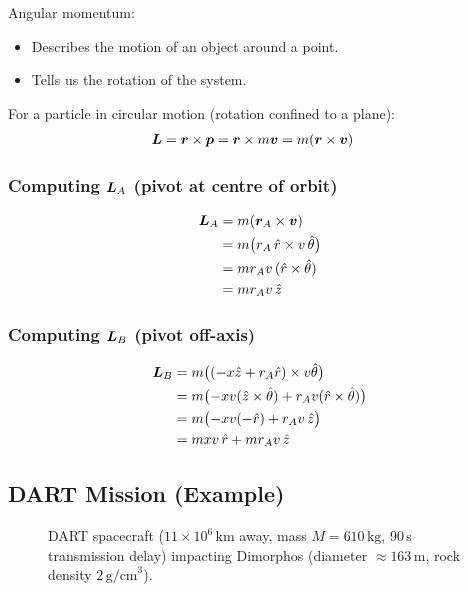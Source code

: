 Angular momentum:
\begin{itemize}
    \item Describes the motion of an object around a point.
    \item Tells us the rotation of the system.
\end{itemize}

For a particle in circular motion (rotation confined to a plane):
\begin{align*}
    \vect{L} &= \lvect{r} \times \lvect{p} = \lvect{r} \times m\lvect{v} = m(\lvect{r}\times\lvect{v})
\end{align*}

\subsubsection*{Computing $\vect{L}_A$ (pivot at centre of orbit)}

\begin{align*}
    \vect{L}_A &= m(\lvect{r}_A \times \lvect{v}) \\
    &= m\bigl(r_A\,\hat{r} \times v\,\hat{\theta}\bigr) \\
    &= mr_A v\,(\hat{r}\times\hat{\theta}) \\
    &= mr_A v\,\hat{z}
\end{align*}

\subsubsection*{Computing $\vect{L}_B$ (pivot off-axis)}

\begin{align*}
    \vect{L}_B &= m\bigl((-x\hat{z}+r_A\hat{r})\times v\hat{\theta}\bigr) \\
    &= m\bigl(-xv(\hat{z}\times\hat{\theta}) + r_A v(\hat{r}\times\hat{\theta})\bigr) \\
    &= m\bigl(-xv(-\hat{r}) + r_A v\,\hat{z}\bigr) \\
    &= mxv\,\hat{r} + mr_A v\,\hat{z}
\end{align*}

\subsection{DART Mission (Example)}

\begin{figure}[H]
\centering
\caption{DART spacecraft ($11\times10^6\,\text{km}$ away, mass $M=610\,\text{kg}$, 90\,s transmission delay) impacting Dimorphos (diameter $\approx163\,\text{m}$, rock density $2\,\text{g/cm}^3$).}
\end{figure}

